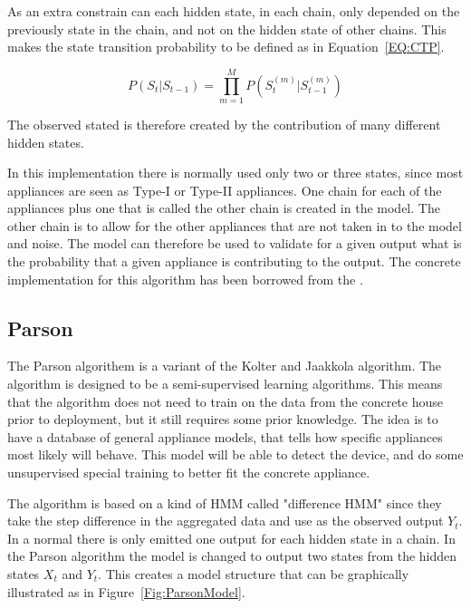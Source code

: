 As an extra constrain can each hidden state, in each chain, only depended on the previously state in the chain, and not on the hidden state of other chains. This makes the state transition probability to be defined as in Equation~\ref{EQ:CTP}. 

\begin{equation}
	P(S_t|S_{t-1}) = \prod_{m = 1}^M P\left( S_t^{(m)}| S_{t-1}^{(m)} \right)
	\label{EQ:CTP}
\end{equation}

The observed stated is therefore created by the contribution of many different hidden states. 

In this implementation there is normally used only two or three states, since most appliances are seen as Type-I or Type-II appliances. One chain for each of the appliances plus one that is called the other chain is created in the model. The other chain is to allow for the other appliances that are not taken in to the model and noise. The model can therefore be used to validate for a given output what is the probability that a given appliance is contributing to the output. The concrete implementation for this algorithm has been borrowed from the  \citep{RefWorks:21}. 

\subsection{Parson}
The Parson algorithem is a variant of the Kolter and Jaakkola algorithm\citep{RefWorks:22}. The algorithm is designed to be a semi-supervised learning algorithms. This means that the algorithm does not need to train on the data from the concrete house prior to deployment, but it still requires some prior knowledge. The idea is to have a database of general appliance models, that tells how specific appliances most likely will behave. This model will be able to detect the device, and do some unsupervised special training to better fit the concrete appliance. 

The algorithm is based on a kind of HMM called "difference HMM" since they take the step difference in the aggregated data and use as the observed output $Y_t$. In a normal  there is only emitted one output for each hidden state in a chain. In the Parson algorithm the model is changed to output two states from the hidden states $X_t$ and $Y_t$. This creates a model structure that can be graphically illustrated as in Figure~\ref{Fig:ParsonModel}\citep{RefWorks:28}. 

